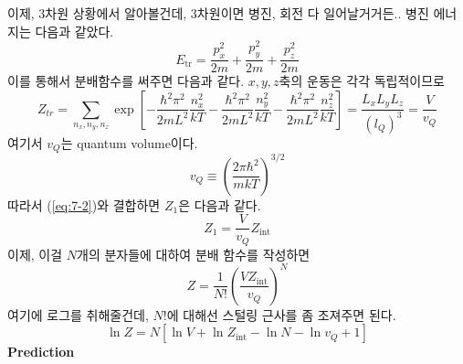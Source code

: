\documentclass{article}
\begin{document}
이제, 3차원 상황에서 알아볼건데, 3차원이면 병진, 회전 다 일어날거거든.. 병진 에너지는 다음과 같았다.
\begin{equation}
    E_{\text{tr}} = \frac{p_x^2}{2m} + \frac{p_y^2}{2m} + \frac{p_z^2}{2m}
\end{equation}
이를 통해서 분배함수를 써주면 다음과 같다. $x, y, z$축의 운동은 각각 독립적이므로
\begin{equation}
    Z_{tr} = \sum_{n_x,n_y, n_z}\exp \left[ -\frac{\hbar^2 \pi^2}{2mL^2} \frac{n_x^2}{kT} -\frac{\hbar^2 \pi^2}{2mL^2} \frac{n_y^2}{kT} -\frac{\hbar^2 \pi^2}{2mL^2} \frac{n_z^2}{kT} \right] = \frac{L_x L_y L_z}{(l_Q)^3} = \frac{V}{v_Q}
\end{equation}
여기서 $v_Q$는 quantum volume이다.
\begin{equation}
    v_Q \equiv \left( \frac{2\pi \hbar^2}{mkT} \right)^{3/2}
\end{equation}
따라서 (\ref{eq:7-2})와 결합하면 $Z_1$은 다음과 같다.
\begin{equation}
    Z_1 = \frac{V}{v_Q} Z_{\text{int}}
\end{equation}
이제, 이걸 $N$개의 분자들에 대하여 분배 함수를 작성하면
\begin{equation}
    Z = \frac{1}{N!} \left( \frac{VZ_{\text{int}}}{v_Q} \right)^N
\end{equation}
여기에 로그를 취해줄건데, $N!$에 대해선 스털링 근사를 좀 조져주면 된다.
\begin{equation}
    \ln Z = N[\ln V + \ln Z_{\text{int}}-\ln N - \ln v_Q + 1]
\end{equation}
\textbf{Prediction}
\end{document}
